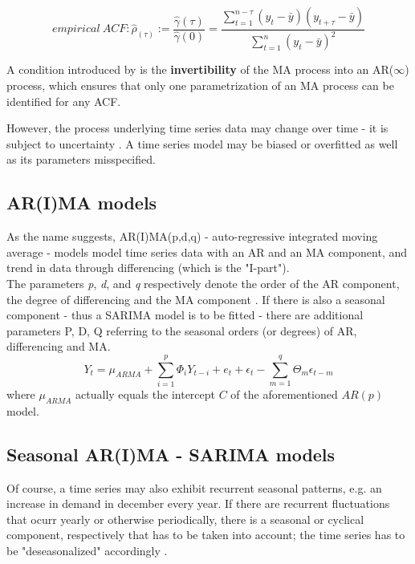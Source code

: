 \documentclass[a4paper, 11pt]{article}
\begin{document}
\begin{equation}
empirical \ ACF: \hat{\rho}_(\tau) := \frac{\hat{\gamma}(\tau)}{\hat{\gamma}(0)} = \frac{\sum_{t = 1}^{n - \tau}(y_{t} - \bar{y})(y_{t + \tau}-\bar{y})}{\sum_{t = 1}^{n}(y_{t}-\bar{y})^2}
\end{equation}

A condition introduced by \cite{Box.1976} is the \textbf{invertibility} of the MA process into an AR($\infty$) process, which ensures that only one parametrization of an MA process can be identified for any ACF.

However, the process underlying time series data may change over time - it is subject to uncertainty \citep{Adhikari.2015}. A time series model may be biased or overfitted as well as its parameters misspecified. \\

\subsection{AR(I)MA models}

As the name suggests, AR(I)MA(p,d,q) - auto-regressive integrated moving average - models model time series data with an AR and an MA component, and trend in data through differencing (which is the "I-part"). \\
The parameters \textit{p}, \textit{d}, and \textit{q} respectively denote the order of the AR component, the degree of differencing and the MA component \citep{Zhao.07022018}.
If there is also a seasonal component - thus a SARIMA model is to be fitted - there are additional parameters P, D, Q referring to the seasonal orders (or degrees) of AR, differencing and MA.\\

\begin{equation}
Y_{t} =  \mu_{ARMA} +  \sum_{i = 1}^{p}\Phi_{i}Y_{t-i} + e_{t}  + \epsilon_{t} - \sum_{m = 1}^{q} \Theta_{m}\epsilon_{t-m} 
\end{equation}
where $\mu_{ARMA}$ actually equals the intercept $C$ of the aforementioned $AR(p)$ model.

\subsection{Seasonal AR(I)MA - SARIMA models}

Of course, a time series may also exhibit recurrent seasonal patterns, e.g. an increase in demand in december every year. If there are recurrent fluctuations that ocurr yearly or otherwise periodically, there is a seasonal or cyclical component, respectively \citep{Vogel.2015} that has to be taken into account; the time series has to be "deseasonalized" accordingly \citep{Benkachcha.2015}.\\
\end{document}
